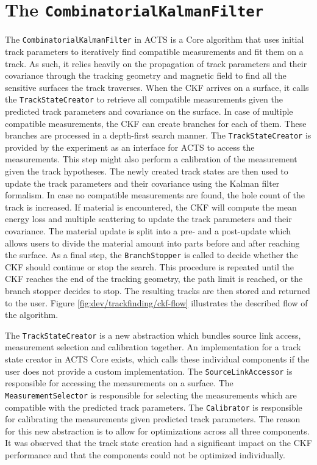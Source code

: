 \section{The \texttt{CombinatorialKalmanFilter}}



The \texttt{CombinatorialKalmanFilter} in ACTS is a Core algorithm that uses initial track parameters to iteratively find compatible measurements and fit them on a track.  As such, it relies heavily on the propagation of track parameters and their covariance through the tracking geometry and magnetic field to find all the sensitive surfaces the track traverses. When the CKF arrives on a surface, it calls the \texttt{TrackStateCreator} to retrieve all compatible measurements given the predicted track parameters and covariance on the surface. In case of multiple compatible measurements, the CKF can create branches for each of them. These branches are processed in a depth-first search manner. The \texttt{TrackStateCreator} is provided by the experiment as an interface for ACTS to access the measurements. This step might also perform a calibration of the measurement given the track hypotheses. The newly created track states are then used to update the track parameters and their covariance using the Kalman filter formalism. In case no compatible measurements are found, the hole count of the track is increased. If material is encountered, the CKF will compute the mean energy loss and multiple scattering to update the track parameters and their covariance. The material update is split into a pre- and a post-update which allows users to divide the material amount into parts before and after reaching the surface. As a final step, the \texttt{BranchStopper} is called to decide whether the CKF should continue or stop the search. This procedure is repeated until the CKF reaches the end of the tracking geometry, the path limit is reached, or the branch stopper decides to stop. The resulting tracks are then stored and returned to the user. Figure \ref{fig:dev/trackfinding/ckf-flow} illustrates the described flow of the algorithm.

The \texttt{TrackStateCreator} is a new abstraction which bundles source link access, measurement selection and calibration together. An implementation for a track state creator in ACTS Core exists, which calls these individual components if the user does not provide a custom implementation. The \texttt{SourceLinkAccessor} is responsible for accessing the measurements on a surface. The \texttt{MeasurementSelector} is responsible for selecting the measurements which are compatible with the predicted track parameters. The \texttt{Calibrator} is responsible for calibrating the measurements given predicted track parameters. The reason for this new abstraction is to allow for optimizations across all three components. It was observed that the track state creation had a significant impact on the CKF performance and that the components could not be optimized individually.

